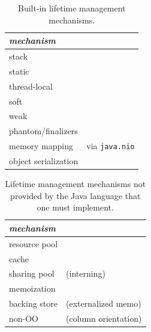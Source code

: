 
\begin{table}
\centering
\begin{tabular}{|l|l|} \hline
\em mechanism & \\ \hline \hline
stack & \\ \hline 
static & \\ \hline
thread-local & \\ \hline
soft & \\ \hline
weak & \\ \hline
phantom/finalizers & \\ \hline
memory mapping & via \texttt{java.nio} \\ \hline 
object serialization & \\ \hline
\end{tabular}
\caption{Built-in lifetime management mechanisms.}
\label{tab:builtin-lifetime-management}
\end{table}

\begin{table}
\centering
\begin{tabular}{|l|l|} \hline
\em mechanism & \\ \hline \hline
resource pool & \\ \hline
cache & \\ \hline
sharing pool & (interning)\\ \hline
memoization & \\ \hline
backing store &(externalized memo) \\ \hline
non-OO & (column orientation) \\ \hline 
\end{tabular}
\caption{Lifetime management mechanisms not provided by the Java language that one must implement.}
\label{tab:software-lifetime-management}
\end{table}




